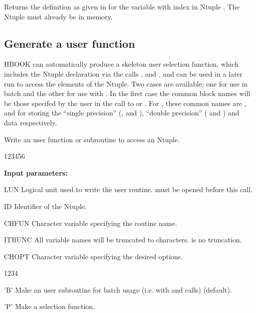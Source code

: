 
\Action

Returns the definition as given in  for
the variable with index  in Ntuple .
The Ntuple must already be in memory.


\subsection{Generate a user function}
\label{sec:userfunction}

HBOOK can automatically produce a skeleton user selection
function, which includes the Ntuple declaration via
the calls ,  and ,
and can be used in a later run to access the elements of
the Ntuple.
Two cases are available; one for use in batch and the other for use with
\PAW.
In the first case the common block names will be those
specifed by the user in the call to  or .
For \PAW{}, these common names are
,  and  for storing
the ``single precision'' (,  and ),
``double precision'' ( and ) and
 data respectively.


\Action

Write an user function or subroutine to access an Ntuple.

\begin{DLttc}{123456}
\item[{\rm\bf Input parameters:}]
\item[LUN] Logical unit used to write the user routine.
            must be opened before this call.
\item[ID] Identifier of the Ntuple.
\item[CHFUN] Character variable specifying the routine name.
\item[ITRUNC] All variable names will be truncated to 
              characters.  is no truncation.
\item[CHOPT]  Character variable specifying the desired options.
   \begin{DLttc}{1234}
     \item['B'] Make an user subroutine for batch usage (i.e.
                with  and  calls) (default).
     \item['P'] Make a \PAW{} selection function.
   \end{DLttc}
\end{DLttc}

